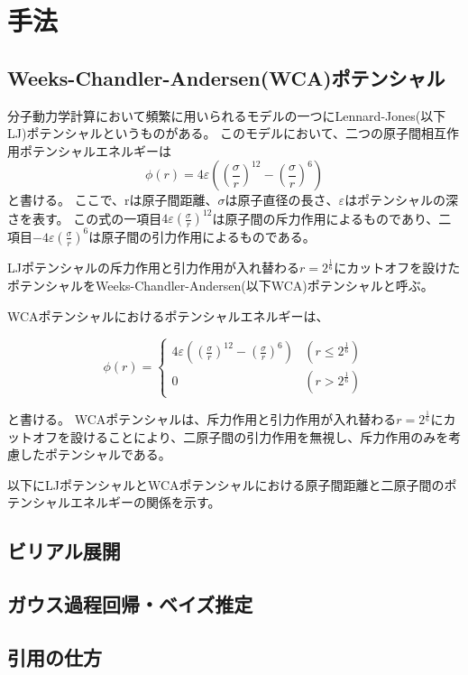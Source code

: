 \documentclass[titlepage]{jsreport}
\begin{document}
\chapter{手法} \label{chap:method}

\section{Weeks-Chandler-Andersen(WCA)ポテンシャル}
分子動力学計算において頻繁に用いられるモデルの一つにLennard-Jones(以下LJ)ポテンシャルというものがある。
このモデルにおいて、二つの原子間相互作用ポテンシャルエネルギーは$$\phi(r)=4{\varepsilon}\left((\frac{\sigma}{r})^{12}-(\frac{\sigma}{r})^6\right)$$
と書ける。
ここで、rは原子間距離、${\sigma}$は原子直径の長さ、${\varepsilon}$はポテンシャルの深さを表す。
この式の一項目$4{\varepsilon}(\frac{\sigma}{r})^{12}$は原子間の斥力作用によるものであり、二項目$-4\varepsilon(\frac{\sigma}{r})^{6}$は原子間の引力作用によるものである。

LJポテンシャルの斥力作用と引力作用が入れ替わる$r=2^{\frac{1}{6}}$にカットオフを設けたポテンシャルをWeeks-Chandler-Andersen(以下WCA)ポテンシャルと呼ぶ。

WCAポテンシャルにおけるポテンシャルエネルギーは、

\[
  \phi(r) = \left\{ \begin{array}{ll}
    4{\varepsilon}\left((\frac{\sigma}{r})^{12}-(\frac{\sigma}{r})^6\right) & (r\leq2^{\frac{1}{6}}) \\
    0 & (r>2^{\frac{1}{6}})
  \end{array} \right.
\]

と書ける\cite{doi:10.1063/1.2176675}。
WCAポテンシャルは、斥力作用と引力作用が入れ替わる$r=2^{\frac{1}{6}}$にカットオフを設けることにより、二原子間の引力作用を無視し、斥力作用のみを考慮したポテンシャルである。

以下にLJポテンシャルとWCAポテンシャルにおける原子間距離と二原子間のポテンシャルエネルギーの関係を示す。


\section{ビリアル展開}


\section{ガウス過程回帰・ベイズ推定}


\section{引用の仕方}
\end{document}
